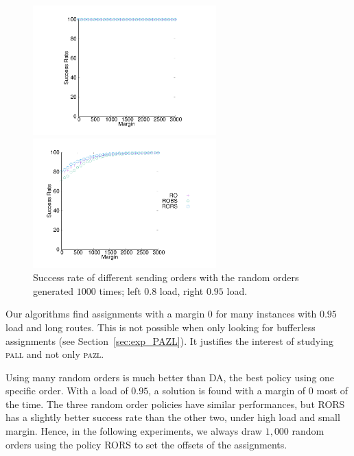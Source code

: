 \documentclass[a4paper,10pt]{journal}
\newcommand\pazl{\textsc{pazl}\xspace}
\newcommand\pall{\textsc{pall}\xspace}
\begin{document}
\begin{figure}[h] 
  \centering
  \begin{minipage}[b]{0.45\linewidth}

  \includegraphics[height=5cm]{departs_gp_25000.pdf}
  \end{minipage}
  \begin{minipage}[b]{0.54\linewidth}
  \includegraphics[height=5cm]{departs_gp_21000.pdf}

\end{minipage}
       \caption{Success rate of different sending orders with the random orders generated $1000$ times; left $0.8$ load, right $0.95$ load.}
      \label{fig:success1000random}
          \end{figure}

     Our algorithms find assignments with a margin $0$ for many instances with $0.95$ load and long routes. This is not possible when only looking for bufferless assignments (see Section~\ref{sec:exp_PAZL}). It justifies the interest of studying \pall and not only \pazl.
  
     Using many random orders is much better than DA, the best policy using one specific order. 
     With a load of $0.95$, a solution is found with a margin of $0$ most of the time. The three random order policies have similar performances, but RORS has a slightly better success rate than the other two, under high load and small margin. Hence, in the following experiments, we always draw $1,000$ random orders using the policy RORS to set the offsets of the assignments.
    
\end{document}
